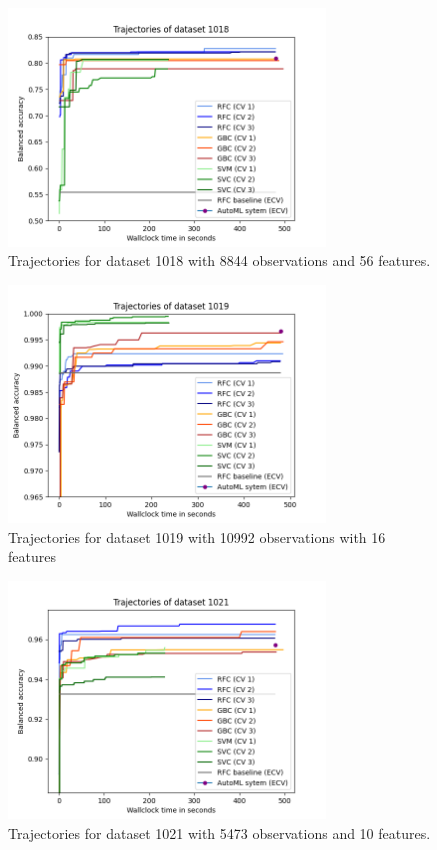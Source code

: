 \documentclass[11pt]{article}
\begin{document}
\begin{figure}[H]
 \centering
  \includegraphics[width=0.75\textwidth]{fig/plot_dataset_1018.png}
  \caption{Trajectories for dataset 1018 with 8844 observations and 56 features.}
\end{figure}

\begin{figure}[H]
 \centering
  \includegraphics[width=0.75\textwidth]{fig/plot_dataset_1019.png}
  \caption{Trajectories for dataset 1019 with 10992 observations with 16 features}
\end{figure}

\begin{figure}[H]
 \centering
  \includegraphics[width=0.75\textwidth]{fig/plot_dataset_1021.png}
  \caption{Trajectories for dataset 1021 with 5473 observations and 10 features.}
\end{figure}
\end{document}
